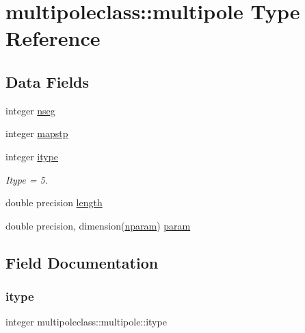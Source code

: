 \hypertarget{structmultipoleclass_1_1multipole}{}\section{multipoleclass\+::multipole Type Reference}
\label{structmultipoleclass_1_1multipole}
\subsection*{Data Fields}
\begin{DoxyCompactItemize}
\item 
integer \mbox{\hyperlink{structmultipoleclass_1_1multipole_a7e808e5433de77a1defc9a21691400dc}{nseg}}
\item 
integer \mbox{\hyperlink{structmultipoleclass_1_1multipole_a4d8dd9ec28f1f2396c1fe8634b1ffb81}{mapstp}}
\item 
integer \mbox{\hyperlink{structmultipoleclass_1_1multipole_a0819a9c738ccf5ddd0aa69c2a7befd2a}{itype}}
\begin{DoxyCompactList}\small\item\em Itype = 5. \end{DoxyCompactList}\item 
double precision \mbox{\hyperlink{structmultipoleclass_1_1multipole_aa096a41e77f2a963837b3ec8d5b3324b}{length}}
\item 
double precision, dimension(\mbox{\hyperlink{namespacemultipoleclass_a67bb1a71461cf39cdd365adab7fec8b9}{nparam}}) \mbox{\hyperlink{structmultipoleclass_1_1multipole_ab06c87e37bb85347c808f7e43bd9bd1f}{param}}
\end{DoxyCompactItemize}


\subsection{Field Documentation}
\mbox{\label{structmultipoleclass_1_1multipole_a0819a9c738ccf5ddd0aa69c2a7befd2a}} 
\subsubsection{\texorpdfstring{itype}{itype}}
{\footnotesize\ttfamily integer multipoleclass\+::multipole\+::itype}



